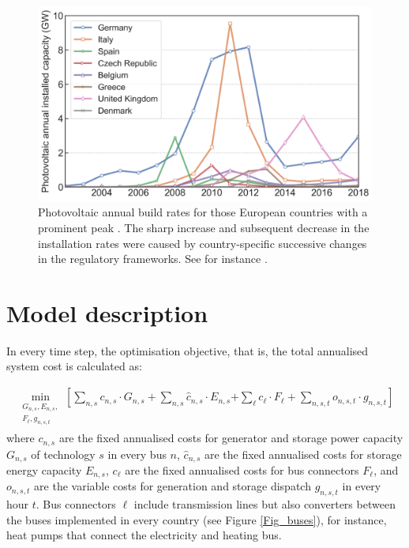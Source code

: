 \documentclass[3p]{elsarticle} %
\begin{document}
\begin{figure}[!h]
\centering
\includegraphics[width=12cm]{../figures/installation_rates_PV.png}
\caption{Photovoltaic annual build rates for those European countries with a prominent peak \cite{IRENA_2019}. The sharp increase and subsequent decrease in the installation rates were caused by country-specific successive changes in the regulatory frameworks. See for instance \cite{Report_Fraunhofer_2019, Victoria_2012}. } \label{fig_installation_rates_PV} 
\end{figure}
 
\FloatBarrier

\section{Model description}

In every time step, the optimisation objective, that is, the total annualised system cost is calculated as:

\begin{align}
 \min_{\substack{G_{n,s},E_{n,s},\\F_\ell,g_{n,s,t}}} \left[ \sum_{n,s} c_{n,s} \cdot G_{n,s} +\sum_{n,s} \hat{c}_{n,s} \cdot E_{n,s} \right. \nonumber 
\left. + \sum_{\ell} c_{\ell} \cdot F_{\ell}+ \sum_{n,s,t} o_{n,s,t} \cdot g_{n,s,t} \right]
\label{eq_objective}
\end{align}
where $c_{n,s}$ are the fixed annualised costs for generator and storage power capacity $G_{n,s}$ of technology $s$ in every bus $n$, $\hat{c}_{n,s}$ are the fixed annualised costs for storage energy capacity $E_{n,s}$, $c_\ell$ are the fixed annualised costs for bus connectors $F_{\ell}$, and $o_{n,s,t}$ are the variable costs for generation and storage dispatch $g_{n,s,t}$ in every hour $t$. Bus connectors $\ell$ include transmission lines but also converters between the buses implemented in every country (see Figure \ref{Fig_buses}), for instance, heat pumps that connect the electricity and heating bus. \\
\end{document}
